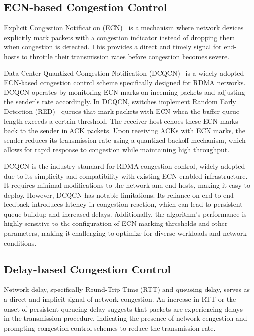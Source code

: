 \documentclass[11pt,en]{elegantpaper}
\begin{document}
\subsection{ECN-based Congestion Control}
\label{sec:ecn-based}

Explicit Congestion Notification (ECN)~\cite{ecn} is a mechanism where network devices explicitly mark packets with a congestion indicator instead of dropping them when congestion is detected. This provides a direct and timely signal for end-hosts to throttle their transmission rates before congestion becomes severe.

Data Center Quantized Congestion Notification (DCQCN)~\cite{dcqcn} is a widely adopted ECN-based congestion control scheme specifically designed for RDMA networks. DCQCN operates by monitoring ECN marks on incoming packets and adjusting the sender's rate accordingly. In DCQCN, switches implement Random Early Detection (RED)~\cite{red} queues that mark packets with ECN when the buffer queue length exceeds a certain threshold. The receiver host echoes these ECN marks back to the sender in ACK packets. Upon receiving ACKs with ECN marks, the sender reduces its transmission rate using a quantized backoff mechanism, which allows for rapid response to congestion while maintaining high throughput.

DCQCN is the industry standard for RDMA congestion control, widely adopted due to its simplicity and compatibility with existing ECN-enabled infrastructure. It requires minimal modifications to the network and end-hosts, making it easy to deploy. However, DCQCN has notable limitations. Its reliance on end-to-end feedback introduces latency in congestion reaction, which can lead to persistent queue buildup and increased delays. Additionally, the algorithm's performance is highly sensitive to the configuration of ECN marking thresholds and other parameters, making it challenging to optimize for diverse workloads and network conditions.

\subsection{Delay-based Congestion Control}
\label{sec:delay-based}

Network delay, specifically Round-Trip Time (RTT) and queueing delay, serves as a direct and implicit signal of network congestion. An increase in RTT or the onset of persistent queueing delay suggests that packets are experiencing delays in the transmission procedure, indicating the presence of network congestion and prompting congestion control schemes to reduce the transmission rate.
\end{document}

